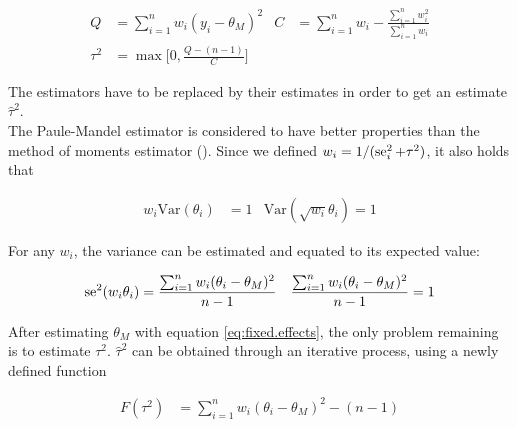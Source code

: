 \documentclass[11pt,a4paper,twoside]{book}\usepackage[]{graphicx}\usepackage[]{color}
\begin{document}
\begin{align}
Q &= \sum_{i = 1}^n w_i(y_i - \theta_M)^2 & C &= \sum_{i = 1}^n w_i - \frac{\sum_{i = 1}^n w_i^2}{\sum_{i = 1}^n w_i} \label{eq:Q.heterogeneity} \\
\tau^2 &= \max\bigg[0, \frac{Q - (n-1)}{C}\bigg] \label{eq:Tau.definition}
\end{align}

The estimators have to be replaced by their estimates in order to get an estimate $\hat{\tau}^2$.\\
The Paule-Mandel estimator \citep{paulemandel} is considered to have better properties than the method of moments estimator (\eg \citealp{tau.estimator.evaluation}). Since we defined $w_i = 1/(\operatorname{se}_i^2 + \tau^2)$, it also holds that

\begin{align}
w_i \textrm{Var}(\theta_i) &= 1 & \textrm{Var}(\sqrt{w_i}\theta_i) = 1 \nonumber
\end{align}

For any $w_i$, the variance can be estimated and equated to its expected value:

\begin{align}
\operatorname{se}^2(w_i\theta_i) &= \frac{\sum_{i = 1}^n w_i(\theta_i - \theta_M)^2}{n-1} & \frac{\sum_{i = 1}^n w_i(\theta_i - \theta_M)^2}{n-1} = 1 \label{eq:paulemandel}
\end{align}

After estimating $\theta_M$ with equation \eqref{eq:fixed.effects}, the only problem remaining is to estimate $\tau^2$. $\hat{\tau}^2$ can be obtained through an iterative process, using a newly defined function

\begin{align}
F(\tau^2) &= \sum_{i = 1}^n w_i(\theta_i - \theta_M)^2 - (n-1) \nonumber
\end{align}
\end{document}
